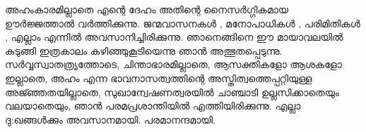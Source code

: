 അഹംകാരമില്ലാതെ എന്റെ ദേഹം അതിന്റെ നൈസര്‍ഗ്ഗികമായ  ഊര്‍ജ്ജത്താല്‍ വര്‍ത്തിക്കുന്നു. ജന്മവാസനകള്‍ , മനോപാധികള്‍ , പരിമിതികള്‍ , എല്ലാം എന്നില്‍ അവസാനിച്ചിരിക്കുന്നു. ഞാനെങ്ങിനെ ഈ മായാവലയില്‍ കുടുങ്ങി ഇത്രകാലം കഴിഞ്ഞുകൂടിയെന്നു ഞാന്‍ അത്ഭുതപ്പെടുന്നു. സര്‍വ്വസ്വാതത്ര്യത്തോടെ, ചിന്താഭാരമില്ലാതെ, ആസക്തികളോ ആശകളോ ഇല്ലാതെ, അഹം എന്ന ഭാവനാസത്വത്തിന്റെ അസ്തിത്വത്തെപ്പറ്റിയുള്ള അജ്ഞ്ഞതയില്ലാതെ, സുഖാന്വേഷണത്വരയില്‍ ചാഞ്ചാടി ഉല്ലസിക്കാതെയും വലയാതെയും,  ഞാന്‍ പരമപ്രശാന്തിയില്‍ എത്തിയിരിക്കുന്നു. എല്ലാ ദു:ഖങ്ങള്‍ക്കും അവസാനമായി. പരമാനന്ദമായി. 

